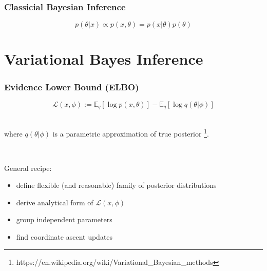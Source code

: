 \documentclass[10pt]{beamer}
\begin{document}
\begin{frame}
\frametitle{Classicial Bayesian Inference}

$$ p(\theta| x) \propto p(x, \theta) = p(x|\theta) p(\theta)$$

\end{frame}


\section{Variational Bayes Inference}




\begin{frame}
\frametitle{Evidence Lower Bound (ELBO)}

$$ \mathcal{L}(x, \phi) := \mathbb{E}_{q}\left[\log p(x, \theta) \right] - \mathbb{E}_{q}\left[\log q(\theta| \phi) \right] $$ \


where $q(\theta|\phi)$ is a parametric approximation of true posterior \footnote{https://en.wikipedia.org/wiki/Variational\_Bayesian\_methods}.

\ \ \
\ \ 

General recipe:

\begin{itemize}
    \item define flexible (and reasonable) family of posterior distributions
    \item derive analytical form of $\mathcal{L}(x, \phi)$
    \item group independent parameters
    \item find coordinate ascent updates 
\end{itemize}



\end{frame}

\end{document}
